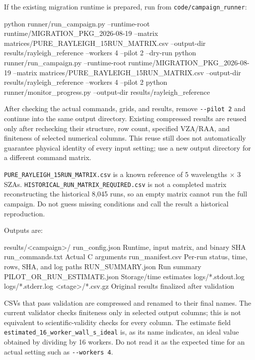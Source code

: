 If the existing migration runtime is prepared, run from \texttt{code/\allowbreak{}campaign\_\allowbreak{}runner}:


\begin{ManualCode}
python runner/run_campaign.py --runtime-root runtime/MIGRATION_PKG_2026-08-19 --matrix matrices/PURE_RAYLEIGH_15RUN_MATRIX.csv --output-dir results/rayleigh_reference --workers 4 --pilot 2 --dry-run
python runner/run_campaign.py --runtime-root runtime/MIGRATION_PKG_2026-08-19 --matrix matrices/PURE_RAYLEIGH_15RUN_MATRIX.csv --output-dir results/rayleigh_reference --workers 4 --pilot 2
python runner/monitor_progress.py --output-dir results/rayleigh_reference
\end{ManualCode}

After checking the actual commands, grids, and results, remove \texttt{-\allowbreak{}-\allowbreak{}pilot 2} and continue into the same output directory. Existing compressed results are reused only after rechecking their structure, row count, specified VZA/RAA, and finiteness of selected numerical columns. This reuse still does not automatically guarantee physical identity of every input setting; use a new output directory for a different command matrix.

\texttt{PURE\_\allowbreak{}RAYLEIGH\_\allowbreak{}15RUN\_\allowbreak{}MATRIX.\allowbreak{}csv} is a known reference of 5 wavelengths \ensuremath{\times} 3 SZAs. \texttt{HISTORICAL\_\allowbreak{}RUN\_\allowbreak{}MATRIX\_\allowbreak{}REQUIRED.\allowbreak{}csv} is not a completed matrix reconstructing the historical 8,045 runs, so an empty matrix cannot run the full campaign. Do not guess missing conditions and call the result a historical reproduction.

Outputs are:


\begin{ManualCode}
results/<campaign>/
  run_config.json             Runtime, input matrix, and binary SHA
  run_commands.txt            Actual C arguments
  run_manifest.csv            Per-run status, time, rows, SHA, and log paths
  RUN_SUMMARY.json            Run summary
  PILOT_OR_RUN_ESTIMATE.json  Storage/time estimates
  logs/*.stdout.log
  logs/*.stderr.log
  <stage>/*.csv.gz            Original results finalized after validation
\end{ManualCode}

CSVs that pass validation are compressed and renamed to their final names. The current validator checks finiteness only in selected output columns; this is not equivalent to scientific-validity checks for every column. The estimate field \texttt{estimated\_\allowbreak{}16\_\allowbreak{}worker\_\allowbreak{}wall\_\allowbreak{}s\_\allowbreak{}ideal} is, as its name indicates, an ideal value obtained by dividing by 16 workers. Do not read it as the expected time for an actual setting such as \texttt{-\allowbreak{}-\allowbreak{}workers 4}.

